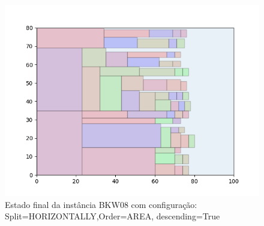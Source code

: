 \begin{figure}[H]
    \centering
    \caption[]{Estado final da instância BKW08 com configuração: Split=HORIZONTALLY,Order=AREA, descending=True}
    \label{fig:bkw08-horizontally-area-true}
    \includegraphics[scale=0.5]{output/figures/bkw/bkw08/horizontally/area/true/00}
\end{figure}